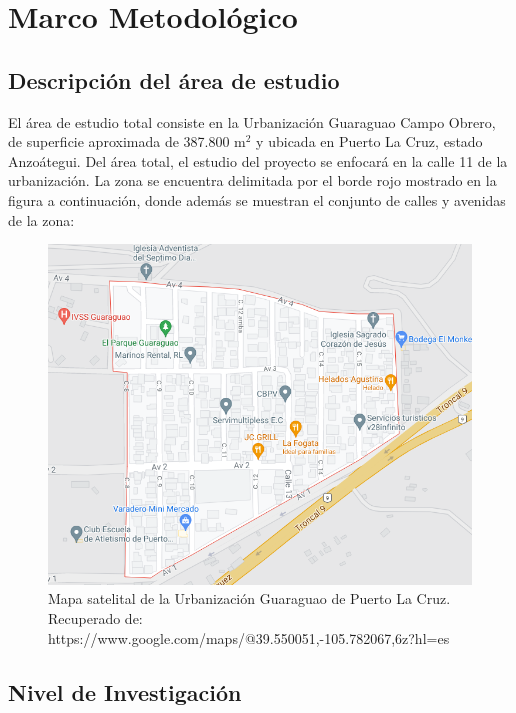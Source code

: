 \vspace*{6cm}
\chapter{Marco Metodológico}
\newpage

\section{Descripción del área de estudio}

El área de estudio total consiste en la Urbanización Guaraguao Campo Obrero, de superficie aproximada de 387.800 m$^2$ y ubicada en Puerto La Cruz, estado Anzoátegui. Del área total, el estudio del proyecto se enfocará en la calle 11 de la urbanización. La zona se encuentra delimitada por el borde rojo mostrado en la figura a continuación, donde además se muestran el conjunto de calles y avenidas de la zona:

\begin{figure}[h]
    \centering
    \includegraphics[width=15cm]{Media/Urb Guaraguao.png}
    \caption{Mapa satelital de la Urbanización Guaraguao de Puerto La Cruz. Recuperado de:\\[6pt] https://www.google.com/maps/@39.550051,-105.782067,6z?hl=es}
    \label{fig:mapa}
\end{figure}

\section{Nivel de Investigación}


